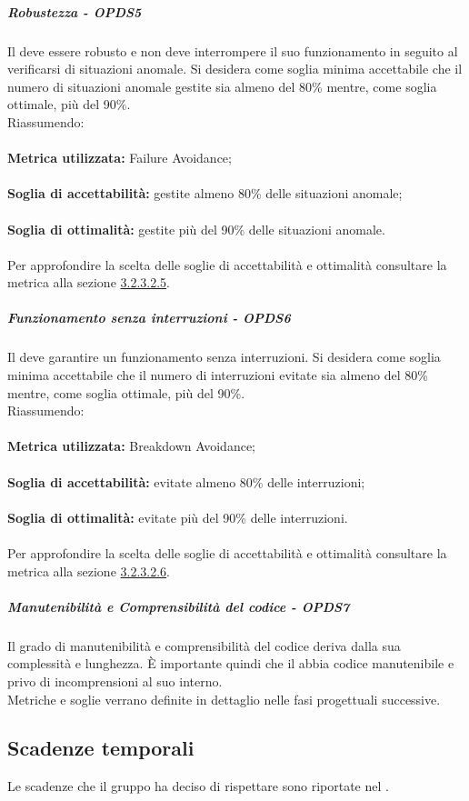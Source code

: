 \documentclass[PianoDiQualifica.tex]{subfiles}
\begin{document}
				\subparagraph{Robustezza - OPDS5}
				Il  deve essere robusto e non deve interrompere il suo funzionamento in seguito al verificarsi di situazioni anomale.
				Si desidera come soglia minima accettabile che il numero di situazioni anomale gestite sia almeno del 80\% mentre, come soglia ottimale, più del 90\%. \\
				Riassumendo: \\ \\
				\textbf{Metrica utilizzata:} Failure Avoidance;\\ \\
				\textbf{Soglia di accettabilità:} gestite almeno 80\% delle situazioni anomale; \\ \\
				\textbf{Soglia di ottimalità:} gestite più del 90\% delle situazioni anomale. \\ \\
				Per approfondire la scelta delle soglie di accettabilità e ottimalità consultare la metrica alla sezione \hyperlink{failure}{3.2.3.2.5}.
				
				\subparagraph{Funzionamento senza interruzioni - OPDS6}
				Il  deve garantire un funzionamento senza interruzioni.
				Si desidera come soglia minima accettabile che il numero di interruzioni evitate sia almeno del 80\% mentre, come soglia ottimale, più del 90\%. \\
				Riassumendo: \\ \\
				\textbf{Metrica utilizzata:} Breakdown Avoidance;\\ \\
				\textbf{Soglia di accettabilità:} evitate almeno 80\% delle interruzioni; \\ \\
				\textbf{Soglia di ottimalità:} evitate più del 90\% delle interruzioni. \\ \\
				Per approfondire la scelta delle soglie di accettabilità e ottimalità consultare la metrica alla sezione \hyperlink{breakdown}{3.2.3.2.6}.
				
				\subparagraph{Manutenibilità e Comprensibilità del codice - OPDS7}
				Il grado di manutenibilità e comprensibilità del codice deriva dalla sua complessità e lunghezza. È importante quindi che il  abbia codice manutenibile e
				privo di incomprensioni al suo interno. \\
				Metriche e soglie verrano definite in dettaglio nelle fasi progettuali successive.
				
		\subsection{Scadenze temporali}
		Le scadenze che il gruppo \GRUPPO{} ha deciso di rispettare sono riportate nel \PPdocRR{}.
				
\end{document}
